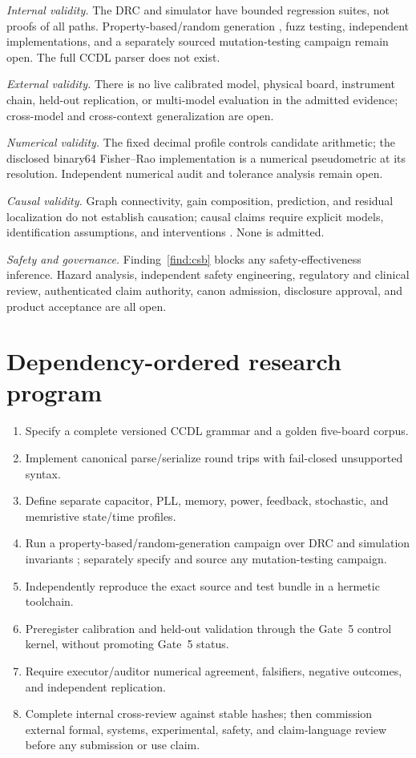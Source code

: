 \documentclass[11pt]{amsart}
\theoremstyle{definition}
\theoremstyle{remark}
\begin{document}
\emph{Internal validity.} The DRC and simulator have bounded regression suites, not proofs of all paths. Property-based/random generation \cite{quickcheck}, fuzz testing, independent implementations, and a separately sourced mutation-testing campaign remain open. The full CCDL parser does not exist.

\emph{External validity.} There is no live calibrated model, physical board, instrument chain, held-out replication, or multi-model evaluation in the admitted evidence; cross-model and cross-context generalization are open.

\emph{Numerical validity.} The fixed decimal profile controls candidate arithmetic; the disclosed binary64 Fisher--Rao implementation is a numerical pseudometric at its resolution. Independent numerical audit and tolerance analysis remain open.

\emph{Causal validity.} Graph connectivity, gain composition, prediction, and residual localization do not establish causation; causal claims require explicit models, identification assumptions, and interventions \cite{pearl}. None is admitted.

\emph{Safety and governance.} Finding~\ref{find:csb} blocks any safety-effectiveness inference. Hazard analysis, independent safety engineering, regulatory and clinical review, authenticated claim authority, canon admission, disclosure approval, and product acceptance are all open.

\section{Dependency-ordered research program}\label{sec:program}

\begin{enumerate}
\item Specify a complete versioned CCDL grammar and a golden five-board corpus.
\item Implement canonical parse/serialize round trips with fail-closed unsupported syntax.
\item Define separate capacitor, PLL, memory, power, feedback, stochastic, and memristive state/time profiles.
\item Run a property-based/random-generation campaign over DRC and simulation invariants \cite{quickcheck}; separately specify and source any mutation-testing campaign.
\item Independently reproduce the exact source and test bundle in a hermetic toolchain.
\item Preregister calibration and held-out validation through the Gate~5 control kernel, without promoting Gate~5 status.
\item Require executor/auditor numerical agreement, falsifiers, negative outcomes, and independent replication.
\item Complete internal cross-review against stable hashes; then commission external formal, systems, experimental, safety, and claim-language review before any submission or use claim.
\end{enumerate}
\end{document}
